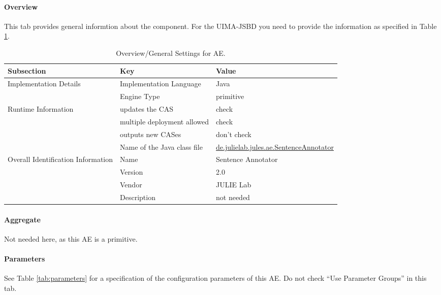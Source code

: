 \documentclass[11pt,a4paper,halfparskip]{scrartcl}
\begin{document}
\paragraph{Overview}
This tab provides general informtion about the component. For the
UIMA-JSBD you need to provide the information as specified in Table
\ref{tab:overview}.

\begin{table}[h!]
  \centering
  \begin{tabular}{|p{3.5cm}|p{4cm}|p{6cm}|}
    \hline
    Subsection & Key & Value \\
    \hline\hline
    Implementation Details & Implementation Language & Java \\
    \cline{2-3}
    & Engine Type & primitive \\
    \hline
    Runtime Information & updates the CAS & check \\
    \cline{2-3}
    & multiple deployment allowed & check \\
    \cline{2-3}
    & outputs new CASes &  don't check \\
    \cline{2-3}
    & Name of the Java class file & \url{de.julielab.jules.ae.SentenceAnnotator}\\
    \hline
    Overall Identification Information & Name &  Sentence Annotator \\
    \cline{2-3}
    & Version &  2.0 \\
    \cline{2-3}
    & Vendor & JULIE Lab\\
    \cline{2-3}
    & Description & not needed\\
    \hline
  \end{tabular}
  \caption{Overview/General Settings for AE.}
  \label{tab:overview}
\end{table}


\paragraph{Aggregate}
Not needed here, as this AE is a primitive.

\paragraph{Parameters}
\label{sss:parameters}

See Table \ref{tab:parameters} for a specification of the
configuration parameters of this AE. Do not check ``Use Parameter
Groups'' in this tab.
\end{document}
